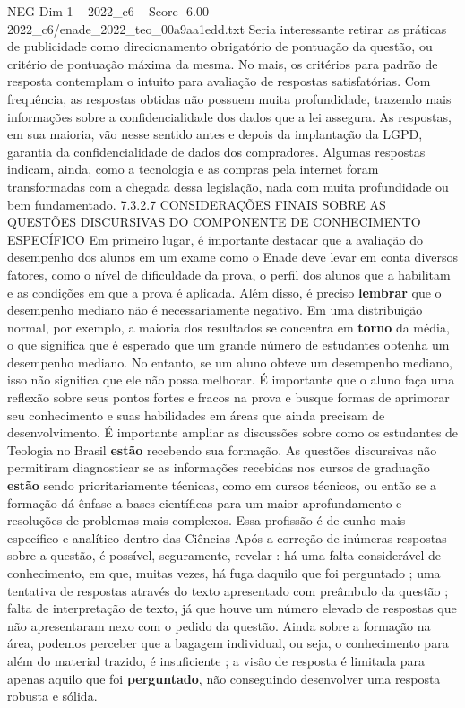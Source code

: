 \begin{textsample}{NEG Dim 1 – 2022\_c6 – Score -6.00 – 2022\_c6/enade\_2022\_teo\_00a9aa1edd.txt}
Seria interessante retirar as práticas de publicidade como direcionamento obrigatório de pontuação da questão, ou critério de pontuação máxima da mesma.
No mais, os critérios para padrão de resposta contemplam o intuito para avaliação de respostas satisfatórias.
Com frequência, as respostas obtidas não possuem muita profundidade, trazendo mais informações sobre a confidencialidade dos dados que a lei assegura.
As respostas, em sua maioria, vão nesse sentido antes e depois da implantação da LGPD, garantia da confidencialidade de dados dos compradores.
Algumas respostas indicam, ainda, como a tecnologia e as compras pela internet foram transformadas com a chegada dessa legislação, nada com muita profundidade ou bem fundamentado. 7.3.2.7 CONSIDERAÇÕES FINAIS SOBRE AS QUESTÕES DISCURSIVAS DO COMPONENTE DE CONHECIMENTO ESPECÍFICO Em primeiro lugar, é importante destacar que a avaliação do desempenho dos alunos em um exame como o Enade deve levar em conta diversos fatores, como o nível de dificuldade da prova, o perfil dos alunos que a habilitam e as condições em que a prova é aplicada.
Além disso, é preciso \textbf{lembrar} que o desempenho mediano não é necessariamente negativo.
Em uma distribuição normal, por exemplo, a maioria dos resultados se concentra em \textbf{torno} da média, o que significa que é esperado que um grande número de estudantes obtenha um desempenho mediano.
No entanto, se um aluno obteve um desempenho mediano, isso não significa que ele não possa melhorar.
É importante que o aluno faça uma reflexão sobre seus pontos fortes e fracos na prova e busque formas de aprimorar seu conhecimento e suas habilidades em áreas que ainda precisam de desenvolvimento.
É importante ampliar as discussões sobre como os estudantes de Teologia no Brasil \textbf{estão} recebendo sua formação.
As questões discursivas não permitiram diagnosticar se as informações recebidas nos cursos de graduação \textbf{estão} sendo prioritariamente técnicas, como em cursos técnicos, ou então se a formação dá ênfase a bases científicas para um maior aprofundamento e resoluções de problemas mais complexos.
Essa profissão é de cunho mais específico e analítico dentro das Ciências Após a correção de inúmeras respostas sobre a questão, é possível, seguramente, revelar : há uma falta considerável de conhecimento, em que, muitas vezes, há fuga daquilo que foi perguntado ; uma tentativa de respostas através do texto apresentado com preâmbulo da questão ; falta de interpretação de texto, já que houve um número elevado de respostas que não apresentaram nexo com o pedido da questão.
Ainda sobre a formação na área, podemos perceber que a bagagem individual, ou seja, o conhecimento para além do material trazido, é insuficiente ; a visão de resposta é limitada para apenas aquilo que foi \textbf{perguntado}, não conseguindo desenvolver uma resposta robusta e sólida.

\end{textsample}
